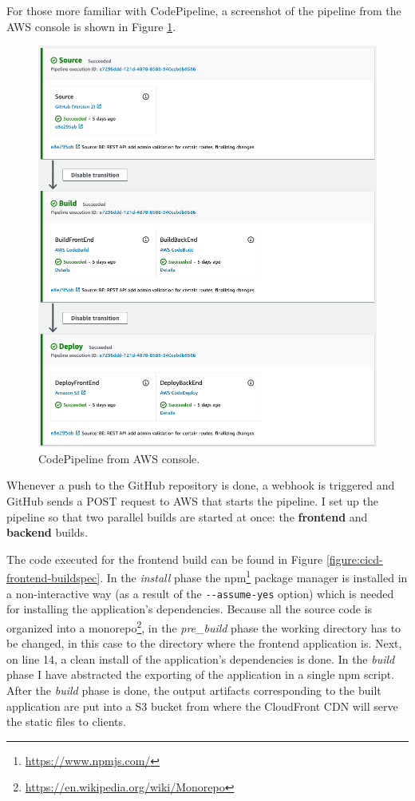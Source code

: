 For those more familiar with CodePipeline, a screenshot of the pipeline from the AWS console is shown in Figure \ref{figure:codepipeline-cicd}.

\begin{figure}[H]
	\centering
	\includegraphics[width=\textwidth,keepaspectratio]{images/architecture/codepipeline-cicd.png}
	\caption{CodePipeline from AWS console.}
	\label{figure:codepipeline-cicd}
\end{figure}

Whenever a push to the GitHub repository is done, a webhook is triggered and GitHub sends a POST request to AWS that starts the pipeline. I set up the pipeline so that two parallel builds are started at once: the \textbf{frontend} and \textbf{backend} builds.

The code executed for the frontend build can be found in Figure \ref{figure:cicd-frontend-buildspec}. In the \textit{install} phase the npm\footnote{\href{https://www.npmjs.com/}{https://www.npmjs.com/}} package manager is installed in a non-interactive way (as a result of the \verb|--assume-yes| option) which is needed for installing the application's dependencies. Because all the source code is organized into a monorepo\footnote{\href{https://en.wikipedia.org/wiki/Monorepo}{https://en.wikipedia.org/wiki/Monorepo}}, in the \textit{pre\_build} phase the working directory has to be changed, in this case to the directory where the frontend application is. Next, on line 14, a clean install of the application's dependencies is done. In the \textit{build} phase I have abstracted the exporting of the application in a single npm script. After the \textit{build} phase is done, the output artifacts corresponding to the built application are put into a S3 bucket from where the CloudFront CDN will serve the static files to clients.


